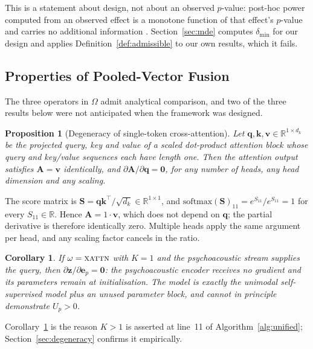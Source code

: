 \documentclass[journal,onecolumn,11pt,draftclsnofoot]{IEEEtran}   %
\newtheorem{proposition}{Proposition}
\newtheorem{corollary}{Corollary}
\begin{document}
This is a statement about design, not about an observed $p$-value: post-hoc
power computed from an observed effect is a monotone function of that effect's
$p$-value and carries no additional information \cite{hoenig2001abuse}.
Section~\ref{sec:mde} computes $\delta_{\min}$ for our design and applies
Definition~\ref{def:admissible} to our own results, which it fails.

\subsection{Properties of Pooled-Vector Fusion}
\label{sec:properties}

The three operators in $\Omega$ admit analytical comparison, and two of the
three results below were not anticipated when the framework was designed.

\begin{proposition}[Degeneracy of single-token cross-attention]
\label{prop:degen}
Let $\mathbf{q},\mathbf{k},\mathbf{v} \in \mathbb{R}^{1\times d_k}$ be the
projected query, key and value of a scaled dot-product attention block whose
query and key/value sequences each have length one. Then the attention output
satisfies $\mathbf{A} = \mathbf{v}$ identically, and
$\partial \mathbf{A}/\partial \mathbf{q} = \mathbf{0}$, for any number of heads,
any head dimension and any scaling.
\end{proposition}
\begin{IEEEproof}
The score matrix is $\mathbf{S} = \mathbf{q}\mathbf{k}^{\!\top}/\sqrt{d_k} \in
\mathbb{R}^{1\times 1}$, and
$\mathrm{softmax}(\mathbf{S})_{11} = e^{S_{11}}/e^{S_{11}} = 1$ for every
$S_{11}\in\mathbb{R}$. Hence $\mathbf{A} = 1\cdot\mathbf{v}$, which does not
depend on $\mathbf{q}$; the partial derivative is therefore identically zero.
Multiple heads apply the same argument per head, and any scaling factor cancels
in the ratio.
\end{IEEEproof}

\begin{corollary}
\label{cor:inert}
If $\omega = \textsc{xattn}$ with $K=1$ and the psychoacoustic stream supplies
the query, then $\partial\mathbf{z}/\partial\mathbf{e}_p = \mathbf{0}$: the
psychoacoustic encoder receives no gradient and its parameters remain at
initialisation. The model is \emph{exactly} the unimodal self-supervised model
plus an unused parameter block, and cannot in principle demonstrate
$U_p > 0$.
\end{corollary}

Corollary~\ref{cor:inert} is the reason $K > 1$ is asserted at line~11 of
Algorithm~\ref{alg:unified}; Section~\ref{sec:degeneracy} confirms it
empirically.
\end{document}
